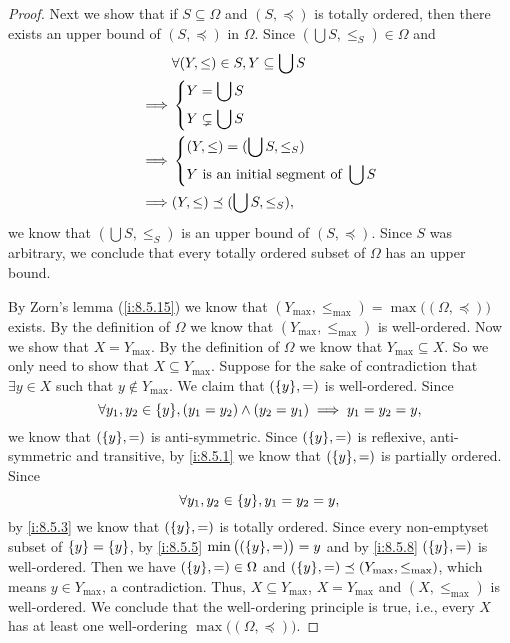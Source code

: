 \begin{proof}
  Next we show that if \(S \subseteq \Omega\) and \((S, \preceq)\) is totally ordered, then there exists an upper bound of \((S, \preceq)\) in \(\Omega\).
  Since \((\bigcup S, \leq_S) \in \Omega\) and
  \begin{align*}
             & \forall (Y, \leq) \in S, Y \subseteq \bigcup S \\
    \implies & \begin{dcases}
                 Y = \bigcup S \\
                 Y \subsetneq \bigcup S
               \end{dcases}                          \\
    \implies & \begin{dcases}
                 (Y, \leq) = (\bigcup S, \leq_S) \\
                 Y \text{ is an initial segment of } \bigcup S
               \end{dcases}   \\
    \implies & (Y, \leq) \preceq (\bigcup S, \leq_S),
  \end{align*}
  we know that \((\bigcup S, \leq_S)\) is an upper bound of \((S, \preceq)\).
  Since \(S\) was arbitrary, we conclude that every totally ordered subset of \(\Omega\) has an upper bound.

  By Zorn's lemma (\cref{i:8.5.15}) we know that \((Y_{\max}, \leq_{\max}) = \max\big((\Omega, \preceq)\big)\) exists.
  By the definition of \(\Omega\) we know that \((Y_{\max}, \leq_{\max})\) is well-ordered.
  Now we show that \(X = Y_{\max}\).
  By the definition of \(\Omega\) we know that \(Y_{\max} \subseteq X\).
  So we only need to show that \(X \subseteq Y_{\max}\).
  Suppose for the sake of contradiction that \(\exists y \in X\) such that \(y \notin Y_{\max}\).
  We claim that \((\set{y}, =)\) is well-ordered.
  Since
  \[
    \forall y_1, y_2 \in \set{y}, (y_1 = y_2) \land (y_2 = y_1) \implies y_1 = y_2 = y,
  \]
  we know that \((\set{y}, =)\) is anti-symmetric.
  Since \((\set{y}, =)\) is reflexive, anti-symmetric and transitive, by \cref{i:8.5.1} we know that \((\set{y}, =)\) is partially ordered.
  Since
  \[
    \forall y_1, y_2 \in \set{y}, y_1 = y_2 = y,
  \]
  by \cref{i:8.5.3} we know that \((\set{y}, =)\) is totally ordered.
  Since every non-emptyset subset of \(\left\lbrace y\right\rbrace = \left\lbrace y\right\rbrace\), by \cref{i:8.5.5} \(\min\big((\set{y}, =)\big) = y\) and by \cref{i:8.5.8} \((\set{y}, =)\) is well-ordered.
  Then we have \((\set{y}, =) \in \Omega\) and \((\set{y}, =) \preceq (Y_{\max}, \leq_{\max})\), which means \(y \in Y_{\max}\), a contradiction.
  Thus, \(X \subseteq Y_{\max}\), \(X = Y_{\max}\) and \((X, \leq_{\max})\) is well-ordered.
  We conclude that the well-ordering principle is true, i.e., every \(X\) has at least one well-ordering \(\max\big((\Omega, \preceq)\big)\).


\end{proof}
